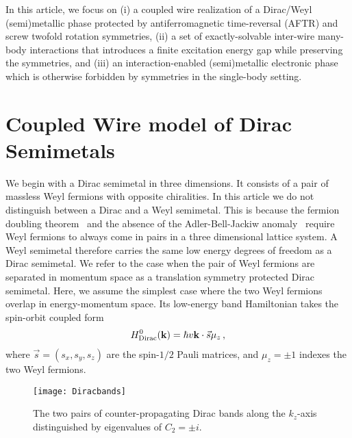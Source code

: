 In this article, we focus on (i) a coupled wire realization of a Dirac/Weyl (semi)metallic phase protected by antiferromagnetic time-reversal (\hypertarget{AFTR}{AFTR}) and screw twofold rotation symmetries, (ii) a set of exactly-solvable inter-wire many-body interactions that introduces a finite excitation energy gap while preserving the symmetries, and (iii) an interaction-enabled (semi)metallic electronic phase which is otherwise forbidden by symmetries in the single-body setting.

\section{Coupled Wire model of Dirac Semimetals}\label{sec:DiracSemimetal}
We begin with a Dirac semimetal in three dimensions. It consists of a pair of massless Weyl fermions with opposite chiralities. In this article we do not distinguish between a Dirac and a Weyl semimetal. This is because the fermion doubling theorem~\cite{Nielsen_Ninomiya_1981,NielsenNinomiyaPLB1981,NielsenNinomiya83} and the absence of the Adler-Bell-Jackiw anomaly~\cite{Adler69,BellJackiw69} require Weyl fermions to always come in pairs in a three dimensional lattice system. A Weyl semimetal therefore carries the same low energy degrees of freedom as a Dirac semimetal. We refer to the case when the pair of Weyl fermions are separated in momentum space as a translation symmetry protected Dirac semimetal. Here, we assume the simplest case where the two Weyl fermions overlap in energy-momentum space. Its low-energy band Hamiltonian takes the spin-orbit coupled form \begin{align}H^0_{\mathrm{Dirac}}({\bf k})=\hbar v{\bf k}\cdot\vec{s}\mu_z \,, \label{DiracHam0}\end{align} where $\vec{s}=(s_x,s_y,s_z)$ are the spin-$1/2$ Pauli matrices, and $\mu_z=\pm1$ indexes the two Weyl fermions.

\begin{figure}[htbp]
	\centering\texttt{[image: Diracbands]}
	\caption[The two pairs of counter-propagating Dirac bands.]{The two pairs of counter-propagating Dirac bands along the $k_z$-axis distinguished by eigenvalues of $C_2=\pm i$.}\label{fig:Diracbands}
\end{figure}

